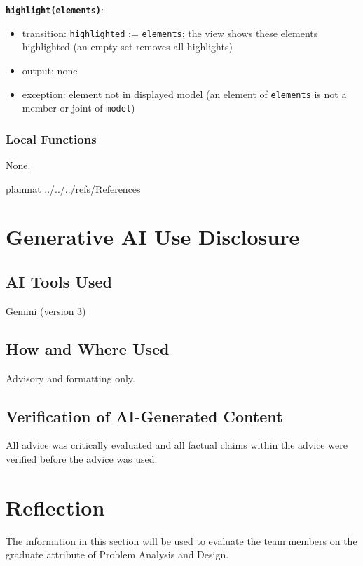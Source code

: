 \documentclass[12pt, titlepage]{article}
\begin{document}
\textbf{\texttt{highlight(elements)}}:
\begin{itemize}
  \item transition: \texttt{highlighted} := \texttt{elements}; the view shows these elements highlighted (an empty set removes all highlights)
  \item output: none
  \item exception: element not in displayed model (an element of \texttt{elements} is not a member or joint of \texttt{model})
\end{itemize}

\subsubsection{Local Functions}
None.


\newpage

{}
 {plainnat}
 {../../../refs/References}

\newpage
\appendix
\section{Generative AI Use Disclosure}

\subsection{AI Tools Used}
Gemini (version 3)

\subsection{How and Where Used}
Advisory and formatting only.

\subsection{Verification of AI-Generated Content}
All advice was critically evaluated and all factual claims within the advice were verified before the advice was used.

\newpage
\section{Reflection}

The information in this section will be used to evaluate the team members on the
graduate attribute of Problem Analysis and Design.
\end{document}

